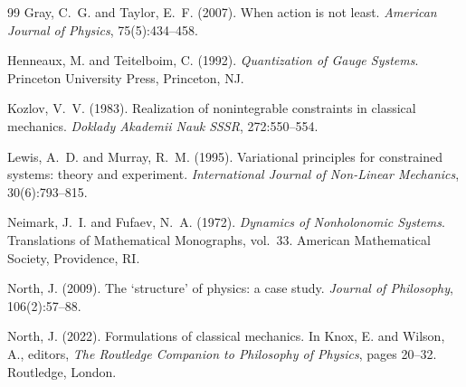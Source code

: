 \documentclass[11pt]{article}
\begin{document}
\begin{thebibliography}{99}
Gray, C.~G. and Taylor, E.~F. (2007).
When action is not least.
\textit{American Journal of Physics}, 75(5):434--458.

Henneaux, M. and Teitelboim, C. (1992).
\textit{Quantization of Gauge Systems}.
Princeton University Press, Princeton, NJ.

Kozlov, V.~V. (1983).
Realization of nonintegrable constraints in classical mechanics.
\textit{Doklady Akademii Nauk SSSR}, 272:550--554.

Lewis, A.~D. and Murray, R.~M. (1995).
Variational principles for constrained systems: theory and experiment.
\textit{International Journal of Non-Linear Mechanics}, 30(6):793--815.

Neimark, J.~I. and Fufaev, N.~A. (1972).
\textit{Dynamics of Nonholonomic Systems}.
Translations of Mathematical Monographs, vol.~33. American Mathematical Society, Providence, RI.

North, J. (2009).
The `structure' of physics: a case study.
\textit{Journal of Philosophy}, 106(2):57--88.

North, J. (2022).
Formulations of classical mechanics.
In Knox, E. and Wilson, A., editors, \textit{The Routledge Companion to Philosophy of Physics}, pages 20--32. Routledge, London.

\end{thebibliography}
\end{document}
